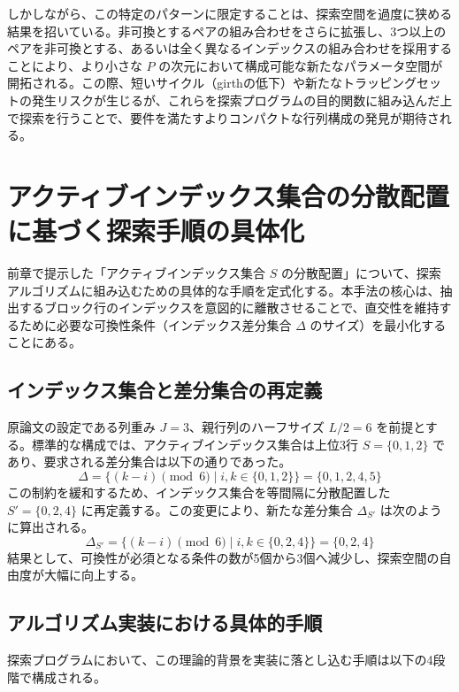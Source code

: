 \documentclass[a4paper,11pt,dvipdfmx]{jsarticle}
\theoremstyle{definition}
\begin{document}
しかしながら、この特定のパターンに限定することは、探索空間を過度に狭める結果を招いている。非可換とするペアの組み合わせをさらに拡張し、3つ以上のペアを非可換とする、あるいは全く異なるインデックスの組み合わせを採用することにより、より小さな $P$ の次元において構成可能な新たなパラメータ空間が開拓される。この際、短いサイクル（girthの低下）や新たなトラッピングセットの発生リスクが生じるが、これらを探索プログラムの目的関数に組み込んだ上で探索を行うことで、要件を満たすよりコンパクトな行列構成の発見が期待される。

\section{アクティブインデックス集合の分散配置に基づく探索手順の具体化}

前章で提示した「アクティブインデックス集合 $S$ の分散配置」について、探索アルゴリズムに組み込むための具体的な手順を定式化する。本手法の核心は、抽出するブロック行のインデックスを意図的に離散させることで、直交性を維持するために必要な可換性条件（インデックス差分集合 $\Delta$ のサイズ）を最小化することにある。

\subsection{インデックス集合と差分集合の再定義}
原論文の設定である列重み $J=3$、親行列のハーフサイズ $L/2=6$ を前提とする。標準的な構成では、アクティブインデックス集合は上位3行 $S = \{0, 1, 2\}$ であり、要求される差分集合は以下の通りであった。
\[
\Delta = \{(k - i) \pmod 6 \mid i, k \in \{0, 1, 2\}\} = \{0, 1, 2, 4, 5\}
\]
この制約を緩和するため、インデックス集合を等間隔に分散配置した $S' = \{0, 2, 4\}$ に再定義する。この変更により、新たな差分集合 $\Delta_{S'}$ は次のように算出される。
\[
\Delta_{S'} = \{(k - i) \pmod 6 \mid i, k \in \{0, 2, 4\}\} = \{0, 2, 4\}
\]
結果として、可換性が必須となる条件の数が5個から3個へ減少し、探索空間の自由度が大幅に向上する。

\subsection{アルゴリズム実装における具体的手順}
探索プログラムにおいて、この理論的背景を実装に落とし込む手順は以下の4段階で構成される。
\end{document}
